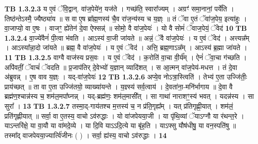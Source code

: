 \documentclass[17pt]{extarticle}
\begin{document}
                  \newline
                                \textbf{ TB 1.3.2.3} \newline
                  य ए॒वं ॅवि॒द्वान्. वा॑ज॒पेये॑न॒ यज॑ते । गच्छ॑ति॒ स्वारा᳚ज्यम् । अग्रꣳ॑ समा॒नानां॒ पर्ये॑ति । तिष्ठ॑न्तेऽस्मै॒ ज्यैष्ठ्या॑य ॥ स वा ए॒ष ब्रा᳚ह्म॒णस्य॑ चै॒व रा॑ज॒न्य॑स्य च य॒ज्ञ्ः ॥ तं ॅवा ए॒तं ॅवा॑ज॒पेय॒ इत्या॑हुः । वा॒जाप्यो॒ वा ए॒षः । वाजꣳ॒॒ ह्ये॑तेन॑ दे॒वा ऐफ्सन्न्॑ ॥ सोमो॒ वै वा॑ज॒पेयः॑ । यो वै सोमं॑ ॅवाज॒पेयं॒ ॅवेद॑ \textbf{ 10} \newline
                  \newline
                                \textbf{ TB 1.3.2.4} \newline
                  वा॒ज्ये॑वैनं॑ पी॒त्वा भ॑वति । आऽस्य॑ वा॒जी जा॑यते ॥ अन्नं॒ ॅवै वा॑ज॒पेयः॑ । य ए॒वं ॅवेद॑ । अत्त्यन्न᳚म् । आऽस्या᳚न्ना॒दो जा॑यते ॥ ब्रह्म॒ वै वा॑ज॒पेयः॑ । य ए॒वं ॅवेद॑ । अत्ति॒ ब्रह्म॒णाऽन्न᳚म् । आऽस्य॑ ब्र॒ह्मा जा॑यते । \textbf{ 11} \newline
                  \newline
                                \textbf{ TB 1.3.2.5} \newline
                  वाग्वै वाज॑स्य प्रस॒वः । य ए॒वं ॅवेद॑ । क॒रोति॑ वा॒चा वी॒र्य᳚म् । ऐनं॑ ॅवा॒चा ग॑च्छति । अपि॑वतीं॒ ॅवाचं॑ ॅवदति ॥ प्र॒जाप॑तिर् दे॒वेभ्यो॑ य॒ज्ञान् व्यादि॑शत् । स आ॒त्मन् वा॑ज॒पेय॑-मधत्त । तं दे॒वा अ॑ब्रुवन्न् । ए॒ष वाव य॒ज्ञ्ः । यद्-वा॑ज॒पेयः॑ \textbf{ 12} \newline
                  \newline
                                \textbf{ TB 1.3.2.6} \newline
                  अप्ये॒व नोऽत्रा॒स्त्विति॑ । तेभ्य॑ ए॒ता उज्जि॑तीः॒ प्राय॑च्छत् ॥ ता वा ए॒ता उज्जि॑तयो॒ व्याख्या॑यन्ते । य॒ज्ञ्स्य॑ सर्व॒त्वाय॑ । दे॒वता॑ना॒-मनि॑र्भागाय ॥ दे॒वा वै ब्रह्म॑ण॒श्चान्न॑स्य च॒ शम॑ल॒मपा᳚घ्नन्न् । यद्-ब्रह्म॑णः॒ शम॑ल॒मासी᳚त् । सा गाथा॑ नाराशꣳ॒॒स्य॑ भवत् । यदन्न॑स्य । सा सुरा᳚ । \textbf{ 13} \newline
                  \newline
                                \textbf{ TB 1.3.2.7} \newline
                  तस्मा॒द्-गाय॑तश्च म॒त्तस्य॑ च॒ न प्र॑ति॒गृह्य᳚म् । यत् प्र॑तिगृह्णी॒यात् । शम॑लं॒ प्रति॑गृह्णीयात् ॥ सर्वा॒ वा ए॒तस्य॒ वाचो ऽव॑रुद्धाः । यो वा॑जपेयया॒जी । या पृ॑थि॒व्यां ॅयाऽग्नौ या र॑थन्त॒रे । याऽन्तरि॑क्षे॒ या वा॒यौ या वा॑मदे॒व्ये । या दि॒वि याऽऽदि॒त्ये या बृ॑ह॒ति । याऽफ्सु यौष॑धीषु॒ या वन॒स्पति॑षु ॥ तस्मा᳚द् वाजपेयया॒ज्यार्त्वि॑जीनः ( ) । सर्वा॒ ह्य॑स्य॒ वाचो ऽव॑रुद्धाः । \textbf{ 14} \newline
\end{document}
